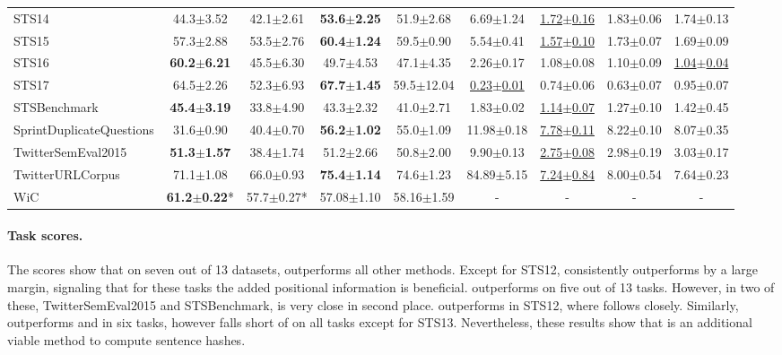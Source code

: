 \begin{table*}[tb]
\begin{tabular}{lcccc|cccc}
        STS14 & 44.3$\pm$3.52 & 42.1$\pm$2.61 & \textbf{53.6$\pm$2.25} & 51.9$\pm$2.68 & 6.69$\pm$1.24 & \underline{1.72$\pm$0.16} & 1.83$\pm$0.06 & 1.74$\pm$0.13 \\
        STS15 & 57.3$\pm$2.88 & 53.5$\pm$2.76 & \textbf{60.4$\pm$1.24} & 59.5$\pm$0.90 & 5.54$\pm$0.41 & \underline{1.57$\pm$0.10} & 1.73$\pm$0.07 & 1.69$\pm$0.09 \\
        STS16 & \textbf{60.2$\pm$6.21} & 45.5$\pm$6.30 & 49.7$\pm$4.53 & 47.1$\pm$4.35 & 2.26$\pm$0.17 & 1.08$\pm$0.08 & 1.10$\pm$0.09 & \underline{1.04$\pm$0.04} \\
        STS17 & 64.5$\pm$2.26 & 52.3$\pm$6.93 & \textbf{67.7$\pm$1.45} & 59.5$\pm$12.04 & \underline{0.23$\pm$0.01} & 0.74$\pm$0.06 & 0.63$\pm$0.07 & 0.95$\pm$0.07 \\
        STSBenchmark & \textbf{45.4$\pm$3.19} & 33.8$\pm$4.90 & 43.3$\pm$2.32 & 41.0$\pm$2.71 & 1.83$\pm$0.02 & \underline{1.14$\pm$0.07} & 1.27$\pm$0.10 & 1.42$\pm$0.45 \\
        \midrule
        SprintDuplicateQuestions & 31.6$\pm$0.90 & 40.4$\pm$0.70 & \textbf{56.2$\pm$1.02} & 55.0$\pm$1.09 & 11.98$\pm$0.18 & \underline{7.78$\pm$0.11} & 8.22$\pm$0.10 & 8.07$\pm$0.35 \\
        TwitterSemEval2015 & \textbf{51.3$\pm$1.57} & 38.4$\pm$1.74 & 51.2$\pm$2.66 & 50.8$\pm$2.00 & 9.90$\pm$0.13 & \underline{2.75$\pm$0.08} & 2.98$\pm$0.19 & 3.03$\pm$0.17 \\
        TwitterURLCorpus & 71.1$\pm$1.08 & 66.0$\pm$0.93 & \textbf{75.4$\pm$1.14} & 74.6$\pm$1.23 & 84.89$\pm$5.15 & \underline{7.24$\pm$0.84} & 8.00$\pm$0.54 & 7.64$\pm$0.23 \\

        \midrule
        WiC                      & \textbf{61.2$\pm$0.22}* & 57.7$\pm$0.27* & 57.08$\pm$1.10 & 58.16$\pm$1.59 & - & - & - & - \\
        \bottomrule
    \end{tabular}
    \label{tab:mteb}
\end{table*}


\paragraph{Task scores.}
The scores show that on seven out of 13 datasets, \methodname outperforms all other methods.
Except for STS12, \methodname consistently outperforms \flyvec by a large margin, signaling that for these tasks the added positional information is beneficial.
\bert outperforms on five out of 13 tasks. 
However, in two of these, TwitterSemEval2015 and STSBenchmark, \methodname is very close in second place.
\flyvec outperforms in STS12, where \methodname follows closely.
Similarly, \methodnametwo outperforms \flyvec and \bert in six tasks, however falls short of \methodname on all tasks except for STS13.
Nevertheless, these results show that \methodnametwo is an additional viable method to compute sentence hashes.

